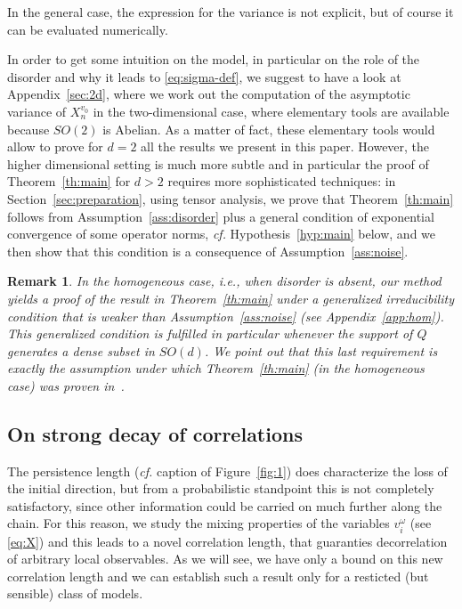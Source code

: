 \documentclass[a4paper,reqno,11pt]{amsart}
\numberwithin{equation}{section}
\newtheorem{rem}[theorem]{Remark}
\begin{document}
\smallskip
\noindent
In the general case, the expression for the variance is not explicit, but of course
it can be evaluated numerically.

\smallskip

In order to get some intuition on the model, in particular  on 
the role of the disorder and  why it leads to \eqref{eq:sigma-def},
we suggest to have a look at
Appendix~\ref{sec:2d}, where we work out the computation of the asymptotic
variance of $X_n^{v_0}$ in the two-dimensional case, where elementary
tools are available because $SO(2)$ is Abelian.
As a matter of fact, these elementary tools would allow to 
prove for $d=2$ all the results we present in this paper.
However, the higher dimensional setting is
much more subtle and in particular
the proof of Theorem~\ref{th:main} for $d>2$ requires
more sophisticated techniques: in Section~\ref{sec:preparation},
using tensor analysis, we prove that Theorem~\ref{th:main} follows from
Assumption~\ref{ass:disorder} plus
a general condition of exponential convergence of some operator
norms, {\sl cf.} Hypothesis~\ref{hyp:main} below, and we then show that this condition is
a consequence of Assumption~\ref{ass:noise}.

\medskip

\begin{rem}\rm \label{rem:hom}
In the {\sl homogeneous} case, i.e., when disorder is absent, 
our method yields a proof  of the result in Theorem~\ref{th:main}
under a generalized irreducibility condition that
is weaker than Assumption~\ref{ass:noise} (see Appendix~\ref{app:hom}).
This generalized condition is fulfilled in particular whenever
the support of $Q$ generates a dense subset in $SO(d)$.
We point out that this last requirement is exactly the assumption under
which Theorem~\ref{th:main} (in the homogeneous case) was 
proven in~\cite{cf:Gor,cf:Roynette}.
\end{rem}

\medskip





\subsection{On strong decay of correlations}

\label{sec:corrs}
The persistence length ({\sl cf.} caption of Figure~\ref{fig:1}) 
does characterize the loss of the initial direction, but
from a probabilistic standpoint this is not completely satisfactory,
since other information could be carried on much further along the chain.
For this reason, we study the mixing properties of the variables 
$v_i^\omega$ (see \eqref{eq:X})
and this leads to a novel correlation length, that guaranties decorrelation of 
arbitrary local observables.
As we will see, we have only a bound on this new correlation length
and we can establish such a result 
only for a resticted (but sensible) class of models.
\end{document}

